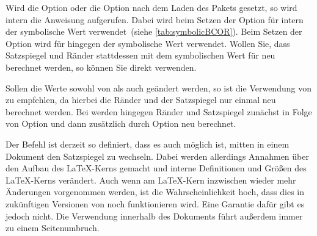 \begin{Declaration}
\end{Declaration}%
\begin{Explain}
  Wird die Option  oder die Option
   nach dem Laden des Pakets
   gesetzt, so wird intern die Anweisung 
  aufgerufen. Dabei wird beim Setzen der Option
   für  intern der symbolische Wert
   verwendet\iffalse %
  , der aus Gründen der Vollständigkeit auch in \autoref{tab:symbolicBCOR} zu
  finden ist\else\ (siehe \autoref{tab:symbolicBCOR})\fi. Beim Setzen der
  Option  wird für  hingegen der
  symbolische Wert  verwendet. Wollen Sie, dass Satzspiegel und
  Ränder stattdessen mit dem symbolischen Wert  für
   neu berechnet werden, so können Sie direkt
   verwenden.
\end{Explain}

\begin{table}
  \caption[{%
    Symbolische -Argumente für %
  }]{%
    Mögliche symbolische -Argumente für
  }
  \label{tab:symbolicBCOR}
  \begin{desctabular}
  \end{desctabular}
\end{table}

Sollen die Werte sowohl von  als auch  geändert werden,
so ist die Verwendung von  zu empfehlen, da hierbei die Ränder
und der Satzspiegel nur einmal neu berechnet werden. Bei
%
 werden hingegen Ränder und
Satzspiegel zunächst in Folge von Option  und
dann zusätzlich durch Option  neu berechnet.

\begin{Explain}
  Der Befehl  ist derzeit so definiert, dass es auch möglich
  ist, mitten in einem Dokument den Satzspiegel zu wechseln. Dabei werden
  allerdings Annahmen über den Aufbau des \LaTeX-Kerns gemacht und interne
  Definitionen und Größen des \LaTeX-Kerns verändert. %
  \iffalse%
  Da am \LaTeX-Kern nur noch zur Beseitigung von Fehlern notwendige %
  \else %
  Auch wenn am \LaTeX-Kern inzwischen wieder mehr %
  \fi %
  Änderungen vorgenommen werden,
  ist die Wahrscheinlichkeit hoch, dass dies in zukünftigen Versionen von
  \LaTeXe{} noch funktionieren wird. Eine Garantie dafür gibt es jedoch
  nicht. Die Verwendung innerhalb des Dokuments führt außerdem immer zu einem
  Seitenumbruch.
\end{Explain}

